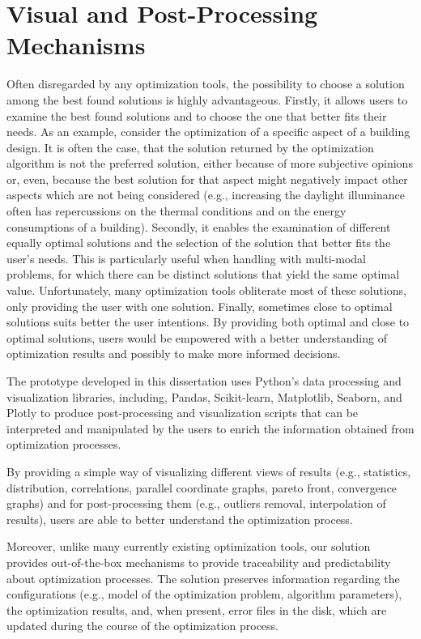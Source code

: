 \section{Visual and Post-Processing Mechanisms}

Often disregarded by any optimization tools, the possibility to choose a solution among the best found solutions is highly advantageous. Firstly, it allows users to examine the best found solutions and to choose the one that better fits their needs. As an example, consider the optimization of a specific aspect of a building design. It is often the case, that the solution returned by the optimization algorithm is not the preferred solution, either because of more subjective opinions or, even, because the best solution for that aspect might negatively impact other aspects which are not being considered (e.g., increasing the daylight illuminance often has repercussions on the thermal conditions and on the energy consumptions of a building). Secondly, it enables the examination of different equally optimal solutions and the selection of the solution that better fits the user's needs. This is particularly useful when handling with multi-modal problems, for which there can be distinct solutions that yield the same optimal value. Unfortunately, many optimization tools obliterate most of these solutions, only providing the user with one solution. Finally, sometimes close to optimal solutions suits better the user intentions. By providing both optimal and close to optimal solutions, users would be empowered with a better understanding of optimization results and possibly to make more informed decisions. 

The prototype developed in this dissertation uses Python's data processing and visualization libraries, including, Pandas, Scikit-learn, Matplotlib, Seaborn, and Plotly to produce post-processing and visualization scripts that can be interpreted and manipulated by the users to enrich the information obtained from optimization processes. 

By providing a simple way of visualizing different views of results (e.g., statistics, distribution, correlations, parallel coordinate graphs, pareto front, convergence graphs) and for post-processing them (e.g., outliers removal, interpolation of results), users are able to better understand the optimization process. 

Moreover, unlike many currently existing optimization tools, our solution provides out-of-the-box mechanisms to provide traceability and predictability about optimization processes. The solution preserves information regarding the configurations (e.g., model of the optimization problem, algorithm parameters), the optimization results, and, when present, error files in the disk, which are updated during the course of the optimization process. 

